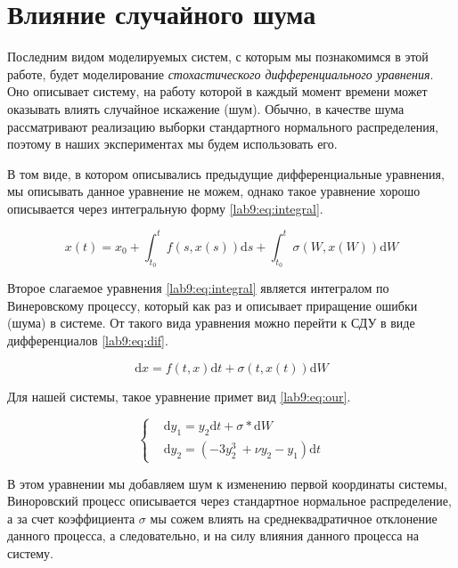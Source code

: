 \chapter{Влияние случайного шума}\label{lab9}
Последним видом моделируемых систем, с которым мы познакомимся
в этой работе, будет моделирование \textit{стохастического
дифференциального уравнения}. Оно описывает систему, на работу
которой в каждый момент времени может оказывать влиять
случайное искажение (шум). Обычно, в качестве шума рассматривают
реализацию выборки стандартного нормального распределения,
поэтому в наших экспериментах мы будем использовать его.

В том виде, в котором описывались предыдущие дифференциальные
уравнения, мы описывать данное уравнение не можем, однако
такое уравнение хорошо описывается через интегральную форму
\eqref{lab9:eq:integral}.

\begin{equation}\label{lab9:eq:integral}
    x(t) = x_0 + \int_{t_0}^t f(s,x(s))\mathrm{d}s +
                 \int_{t_0}^t \sigma(W, x(W))\mathrm{d}W
\end{equation}

Второе слагаемое уравнения \eqref{lab9:eq:integral} является
интегралом по Винеровскому процессу, который как раз и
описывает приращение ошибки (шума) в системе. От такого вида
уравнения можно перейти к СДУ в виде дифференциалов
\eqref{lab9:eq:dif}.

\begin{equation}\label{lab9:eq:dif}
    \mathrm{d}x = f(t, x)\mathrm{d}t +
                  \sigma(t, x(t))\mathrm{d}W
\end{equation}

Для нашей системы, такое уравнение примет вид \eqref{lab9:eq:our}.

\begin{equation}\label{lab9:eq:our}
\begin{cases}
    &\mathrm{d}y_1 = y_2\mathrm{d}t + \sigma * \mathrm{d}W\\
    &\mathrm{d}y_2 = (-3y_2^3\ + \nu y_2 - y_1)\mathrm{d}t
\end{cases}
\end{equation}

В этом уравнении мы добавляем шум к изменению первой координаты
системы, Виноровский процесс описывается через стандартное
нормальное распределение, а за счет коэффициента $\sigma$ мы
сожем влиять на среднеквадратичное отклонение данного процесса,
а следовательно, и на силу влияния данного процесса на систему.

